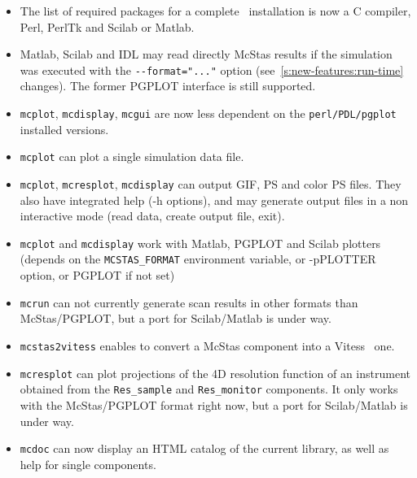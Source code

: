 \begin{itemize}
\item The list of required packages for a complete \MCS\ installation is now a C
    compiler, Perl, PerlTk and Scilab or Matlab.
\item Matlab, Scilab and IDL may read directly McStas results if the simulation
    was executed with the \verb+--format="..."+ option 
    (see~\ref{s:new-features:run-time} changes). The former PGPLOT interface is still
    supported. 
      
        
\item \verb+mcplot+, \verb+mcdisplay+, \verb+mcgui+ are now less dependent on the
    \verb+perl/PDL/pgplot+ installed versions. 
\item \verb+mcplot+ can plot a single simulation data file.
\item \verb+mcplot+, \verb+mcresplot+, \verb+mcdisplay+ can output GIF, PS and color
    PS files. They also have integrated help (-h options), and may generate output
    files in a non interactive mode (read data, create output file, exit).
\item \verb+mcplot+ and \verb+mcdisplay+ work with Matlab, PGPLOT and Scilab plotters
   (depends on the \verb+MCSTAS_FORMAT+ environment variable, or -pPLOTTER option, or
   PGPLOT if not set)
\item \verb+mcrun+ can not currently generate scan results in other formats than
   McStas/PGPLOT, but a port for Scilab/Matlab is under way. 
\item \verb+mcstas2vitess+ enables to convert a McStas component into a
   Vitess~\cite{vitess_webpage} one. 
\item \verb+mcresplot+ can plot projections of the 4D resolution function of an 
   instrument obtained from the \verb+Res_sample+ and \verb+Res_monitor+ components.
   It only works with the McStas/PGPLOT format right now, but a port for Scilab/Matlab
   is under way. 
\item \verb+mcdoc+ can now display an HTML catalog of the current library, as well as help for single components. 
\end{itemize}
